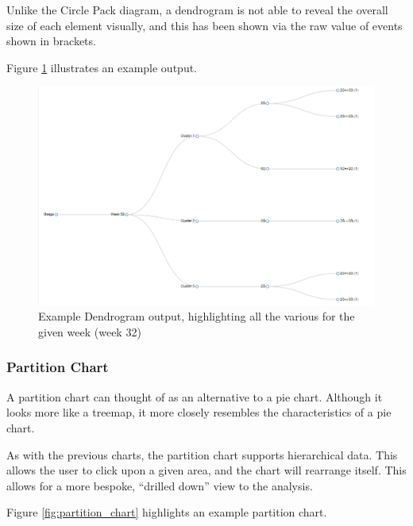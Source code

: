 Unlike the Circle Pack diagram, a dendrogram is not able to reveal the overall 
size of each element visually, and this has been shown via the raw value of 
events shown in brackets.

Figure \ref{fig:dendrogram} illustrates an example output.


\begin{landscape}
  \centering 
    \begin{figure}[H]
      \centering
        \includegraphics[scale=0.65]{chapter8/visualisation/dendrogram.png}
        \caption[Example Dendrogram output]
                {Example Dendrogram output, highlighting all the various for 
                the given week (week 32)}
        \label{fig:dendrogram}
    \end{figure}
\end{landscape}


\newpage
\subsubsection{Partition Chart}
A partition chart can thought of as an alternative to a pie chart. Although it 
looks more like a treemap, it more closely resembles the characteristics of a 
pie chart.

As with the previous charts, the partition chart supports hierarchical data. 
This allows the user to click upon a given area, and the chart will rearrange 
itself. This allows for a more bespoke, ``drilled down'' view to the analysis.

Figure \ref{fig:partition_chart} highlights an example partition chart.

